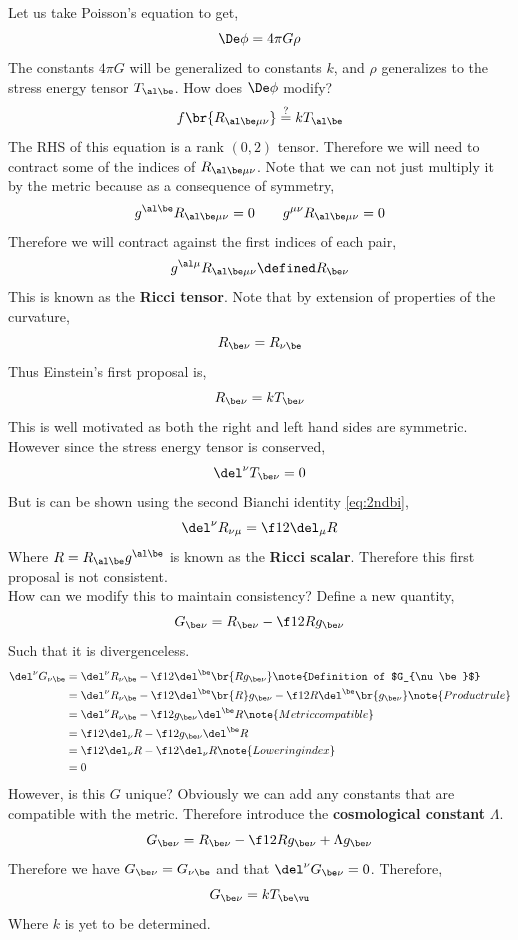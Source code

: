 \documentclass{article}
\begin{document}
Let us take Poisson's equation to get,
\[ \De \phi = 4 \pi G \rho\]
The constants $4 \pi G$ will be generalized to constants $k$, and $\rho$ generalizes to the stress energy tensor $T_{\al\be}$. How does $\De \phi$ modify?
\[ f\br{R_{\al\be\mu\nu}} \stackrel{?}{=} k T_{\al\be} \]
The RHS of this equation is a rank $(0,2)$ tensor. Therefore we will need to contract some of the indices of $R_{\al\be\mu\nu}$. Note that we can not just multiply it by the metric because as a consequence of symmetry,
\[ g^{\al\be} R_{\al\be \mu\nu} = 0 \qquad g^{\mu\nu} R_{\al\be \mu\nu} = 0 \]
Therefore we will contract against the first indices of each pair,
\[ g^{\al\mu} R_{\al\be \mu\nu} \defined R_{\be\nu}\]
This is known as the \textbf{Ricci tensor}. Note that by extension of properties of the curvature,
\[ R_{\be\nu}= R_{\nu\be} \]
Thus Einstein's first proposal is,
\[ R_{\be\nu} = k T_{\be\nu} \]
This is well motivated as both the right and left hand sides are symmetric. However since the stress energy tensor is conserved,
\[ \del^\nu T_{\be\nu} = 0 \]
But is can be shown using the second Bianchi identity \eqref{eq:2ndbi},
\[ \del^\nu R_{\nu\mu} = \f12 \del_\mu R \]
Where $R = R_{\al\be} g^{\al\be}$ is known as the \textbf{Ricci scalar}. Therefore this first proposal is not consistent.\\

How can we modify this to maintain consistency? Define a new quantity,
\[ G_{\be\nu} = R_{\be\nu} - \f12 R g_{\be\nu} \]
Such that it is divergenceless.
\begin{align*}
\del^\nu G_{\nu\be} &= \del^\nu R_{\nu\be} - \f12 \del^\be \br{R g_{\be\nu}} \note{Definition of $G_{\nu\be}$}\\
&= \del^\nu R_{\nu\be} - \f12 \del^\be \br{R }g_{\be\nu} - \f12 R\del^\be \br{ g_{\be\nu}} \note{Product rule} \\
&= \del^\nu R_{\nu\be} - \f12 g_{\be\nu} \del^\be R \note{Metric compatible} \\
&= \f12 \del_\nu R - \f12 g_{\be\nu} \del^\be R \\
&= \f12 \del_\nu R - \f12 \del_\nu R \note{Lowering index} \\
&= 0 \\
\end{align*}
However, is this $G$ unique? Obviously we can add any constants that are compatible with the metric. Therefore introduce the \textbf{cosmological constant} $\Lambda$.
\[ G_{\be\nu} = R_{\be\nu} - \f12 R g_{\be\nu}  + \Lambda g_{\be\nu}\]
Therefore we have $G_{\be\nu} = G_{\nu\be}$ and that $\del^\nu G_{\be\nu} = 0$. Therefore,
\[ G_{\be\nu} = k T_{\be\vu} \]
Where $k$ is yet to be determined.\\
\end{document}
